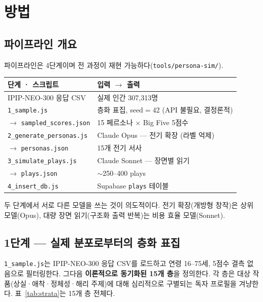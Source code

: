 \documentclass[11pt, a4paper]{article}
\begin{document}
\section{방법}

\subsection{파이프라인 개요}

파이프라인은 4단계이며 전 과정이 재현 가능하다(\texttt{tools/persona-sim/}).

\begin{table}[H]
\centering
\small
\begin{tabular}{l l}
\toprule
\textbf{단계 · 스크립트} & \textbf{입력 $\rightarrow$ 출력} \\
\midrule
IPIP-NEO-300 응답 CSV & 실제 인간 307{,}313명 \\
\texttt{1\_sample.js} & 층화 표집, seed$=$42 (API 불필요, 결정론적) \\
$\rightarrow$ \texttt{sampled\_scores.json} & 15 페르소나 $\times$ Big Five 5점수 \\
\texttt{2\_generate\_personas.js} & Claude Opus --- 전기 확장 (라벨 억제) \\
$\rightarrow$ \texttt{personas.json} & 15개 전기 서사 \\
\texttt{3\_simulate\_plays.js} & Claude Sonnet --- 장면별 읽기 \\
$\rightarrow$ \texttt{plays.json} & $\sim$250--400 plays \\
\texttt{4\_insert\_db.js} & Supabase \texttt{plays} 테이블 \\
\bottomrule
\end{tabular}
\end{table}

두 단계에서 서로 다른 모델을 쓰는 것이 의도적이다. 전기 확장(개방형 창작)은 상위 모델(Opus), 대량 장면 읽기(구조화 출력 반복)는 비용 효율 모델(Sonnet).

\subsection{1단계 --- 실제 분포로부터의 층화 표집}

\texttt{1\_sample.js}는 IPIP-NEO-300 응답 CSV를 로드하고 연령 16--75세, 5점수 결측 없음으로 필터링한다. 그다음 \textbf{이론적으로 동기화된 15개 층}을 정의한다. 각 층은 대상 작품(상실·애착·정체성·해리 주제)에 대해 심리적으로 구별되는 독자 프로필을 겨냥한다. 표~\ref{tab:strata}는 15개 층 전체다.
\end{document}
